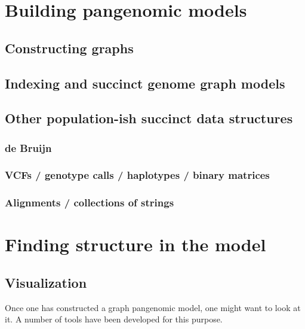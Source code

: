 \section{Building pangenomic models}

\subsection{Constructing graphs} 

\subsection{Indexing and succinct genome graph models}

\subsection{Other population-ish succinct data structures}

\subsubsection{de Bruijn}

\subsubsection{VCFs / genotype calls / haplotypes / binary matrices}

\subsubsection{Alignments / collections of strings}


\section{Finding structure in the model}

\subsection{Visualization}

Once one has constructed a graph pangenomic model, one might want to look at it.
A number of tools have been developed for this purpose.

